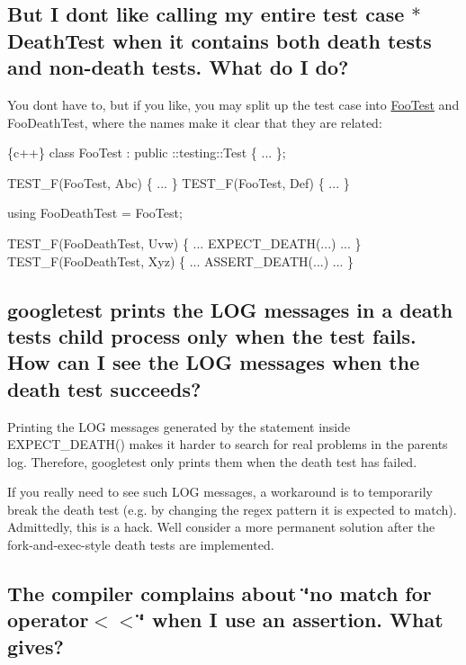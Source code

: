 \subsection*{But I don\textquotesingle{}t like calling my entire test case $\ast$\+Death\+Test when it contains both death tests and non-\/death tests. What do I do?}

You don\textquotesingle{}t have to, but if you like, you may split up the test case into {\ttfamily \mbox{\hyperlink{class_foo_test}{Foo\+Test}}} and {\ttfamily Foo\+Death\+Test}, where the names make it clear that they are related\+:


\begin{DoxyCode}
\{c++\}
class FooTest : public ::testing::Test \{ ... \};

TEST\_F(FooTest, Abc) \{ ... \}
TEST\_F(FooTest, Def) \{ ... \}

using FooDeathTest = FooTest;

TEST\_F(FooDeathTest, Uvw) \{ ... EXPECT\_DEATH(...) ... \}
TEST\_F(FooDeathTest, Xyz) \{ ... ASSERT\_DEATH(...) ... \}
\end{DoxyCode}


\subsection*{googletest prints the L\+OG messages in a death test\textquotesingle{}s child process only when the test fails. How can I see the L\+OG messages when the death test succeeds?}

Printing the L\+OG messages generated by the statement inside {\ttfamily E\+X\+P\+E\+C\+T\+\_\+\+D\+E\+A\+T\+H()} makes it harder to search for real problems in the parent\textquotesingle{}s log. Therefore, googletest only prints them when the death test has failed.

If you really need to see such L\+OG messages, a workaround is to temporarily break the death test (e.\+g. by changing the regex pattern it is expected to match). Admittedly, this is a hack. We\textquotesingle{}ll consider a more permanent solution after the fork-\/and-\/exec-\/style death tests are implemented.

\subsection*{The compiler complains about \char`\"{}no match for \textquotesingle{}operator$<$$<$\textquotesingle{}\char`\"{} when I use an assertion. What gives?}


